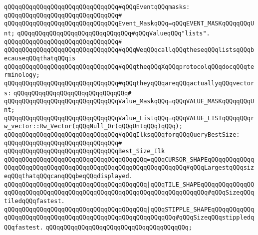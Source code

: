 \newline
\verb|qQQqqQQqqQQqqQQqqQQqqQQqqQQqqQQq#qQQqEventqQQqmasks:|\newline
\verb|qQQqqQQqqQQqqQQqqQQqqQQqqQQqqQQq#|\newline
\verb|qQQqqQQqqQQqqQQqqQQqqQQqqQQqqQQqEvent_MaskqQQq=qQQqEVENT_MASKqQQqqQQqUnt;|\newline
\newline
\verb|qQQqqQQqqQQqqQQqqQQqqQQqqQQqqQQq#qQQqValueqQQq"lists".|\newline
\verb|qQQqqQQqqQQqqQQqqQQqqQQqqQQqqQQq#|\newline
\verb|qQQqqQQqqQQqqQQqqQQqqQQqqQQqqQQq#qQQqWeqQQqcallqQQqtheseqQQqlistsqQQqbecauseqQQqthatqQQqis|\newline
\verb|qQQqqQQqqQQqqQQqqQQqqQQqqQQqqQQq#qQQqtheqQQqXqQQqprotocolqQQqdocqQQqterminology;|\newline
\verb|qQQqqQQqqQQqqQQqqQQqqQQqqQQqqQQq#qQQqtheyqQQqareqQQqactuallyqQQqvectors:|\newline
\verb|qQQqqQQqqQQqqQQqqQQqqQQqqQQqqQQq#|\newline
\verb|qQQqqQQqqQQqqQQqqQQqqQQqqQQqqQQqValue_MaskqQQq=qQQqVALUE_MASKqQQqqQQqUnt;|\newline
\verb|qQQqqQQqqQQqqQQqqQQqqQQqqQQqqQQqValue_ListqQQq=qQQqVALUE_LISTqQQqqQQqrw_vector::Rw_Vector(qQQqNull_Or(qQQqUntqQQq)qQQq);|\newline
\newline
\verb|qQQqqQQqqQQqqQQqqQQqqQQqqQQqqQQq#qQQqIlksqQQqforqQQqQueryBestSize:|\newline
\verb|qQQqqQQqqQQqqQQqqQQqqQQqqQQqqQQq#|\newline
\verb|qQQqqQQqqQQqqQQqqQQqqQQqqQQqqQQqBest_Size_Ilk|\newline
\verb|qQQqqQQqqQQqqQQqqQQqqQQqqQQqqQQqqQQqqQQq=qQQqCURSOR_SHAPEqQQqqQQqqQQqqQQqqQQqqQQqqQQqqQQqqQQqqQQqqQQqqQQqqQQqqQQqqQQqqQQq#qQQqLargestqQQqsizeqQQqthatqQQqcanqQQqbeqQQqdisplayed.|\newline
\verb|qQQqqQQqqQQqqQQqqQQqqQQqqQQqqQQqqQQqqQQq|\verb#|qQQqTILE_SHAPEqQQqqQQqqQQqqQQqqQQqqQQqqQQqqQQqqQQqqQQqqQQqqQQqqQQqqQQqqQQqqQQqqQQqqQQq#\verb|#qQQqSizeqQQqtiledqQQqfastest.|\newline
\verb|qQQqqQQqqQQqqQQqqQQqqQQqqQQqqQQqqQQqqQQq|\verb#|qQQqSTIPPLE_SHAPEqQQqqQQqqQQqqQQqqQQqqQQqqQQqqQQqqQQqqQQqqQQqqQQqqQQqqQQqqQQq#\verb|#qQQqSizeqQQqstippledqQQqfastest.|\newline
\verb|qQQqqQQqqQQqqQQqqQQqqQQqqQQqqQQqqQQqqQQq;|\newline
\newline
